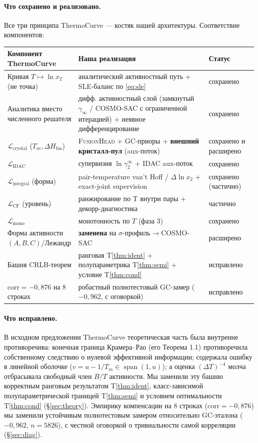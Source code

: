 \documentclass[11pt]{article}
\theoremstyle{plain}
\theoremstyle{definition}
\newcommand{\lnx}{\ln x_2}
\newcommand{\dHfus}{\Delta H_{\mathrm{fus}}}
\newcommand{\Tm}{T_m}
\begin{document}
\paragraph{Что сохранено и реализовано.} Все три принципа ThermoCurve --- костяк
нашей архитектуры. Соответствие компонентов:

\begin{center}
\begin{longtable}{p{4.6cm} p{6.3cm} p{2.6cm}}
\toprule
Компонент ThermoCurve & Наша реализация & Статус \\
\midrule
\endhead
Кривая $T\mapsto\lnx$ (не точка) & аналитический активностный путь + SLE-баланс по \eqref{eq:sle} & сохранено \\
Аналитика вместо численного решателя & дифф. активностный слой (замкнутый $\gamma_\infty$ / COSMO-SAC с ограниченной итерацией) + неявное дифференцирование & сохранено \\
$\mathcal L_{\text{crystal}}$ ($\Tm,\dHfus$) & \textsc{FusionHead} + GC-приоры + \textbf{внешний кристалл-пул} (aux-поток) & сохранено и расширено \\
$\mathcal L_{\text{IDAC}}$ & супервизия $\ln\gamma_2^\infty$ + IDAC aux-поток & сохранено \\
$\mathcal L_{\text{integral}}$ (форма) & pair-temperature van't Hoff / $\Delta\lnx$ + exact-joint supervision & сохранено (частично) \\
$\mathcal L_{\text{CF}}$ (уровень) & ранжирование по T внутри пары + декорр-диагностика & частично \\
$\mathcal L_{\text{mono}}$ & монотонность по $T$ (фаза 3) & сохранено \\
Форма активности $(A,B,C)$/Лежандр & \textbf{заменена} на $\sigma$-профиль$\to$COSMO-SAC & расширено \\
Башня CRLB-теорем & ранговая T\ref{thm:ident} + полупараметрика T\ref{thm:semi} + условие T\ref{thm:cond} & исправлено \\
$\mathrm{corr}=-0{,}876$ на $8$ строках & робастный полнотестовый GC-замер ($-0{,}962$, с оговоркой) & исправлено \\
\bottomrule
\end{longtable}
\end{center}

\paragraph{Что исправлено.} В исходном предложении ThermoCurve теоретическая
часть была внутренне противоречива: конечная граница Крамера--Рао (его Теорема
1.1) противоречила собственному следствию о нулевой эффективной информации;
содержала ошибку в линейной оболочке ($v=u-1/\Tm\in\operatorname{span}(1,u)$);
а оценка $(\Delta T)^{-4}$ молча отбрасывала свободный член $B/T$ активности.
Мы заменили эту башню корректным ранговым результатом T\ref{thm:ident},
класс-зависимой полупараметрической границей T\ref{thm:semi} и условием
оптимальности T\ref{thm:cond} (\S\ref{sec:theory}). Эмпирику компенсации на $8$
строках ($\mathrm{corr}=-0{,}876$) мы заменили устойчивым полнотестовым замером
относительно GC-эталона ($-0{,}962$, $n=5826$), с честной оговоркой о
тривиальности самой корреляции (\S\ref{sec:diag}).
\end{document}
